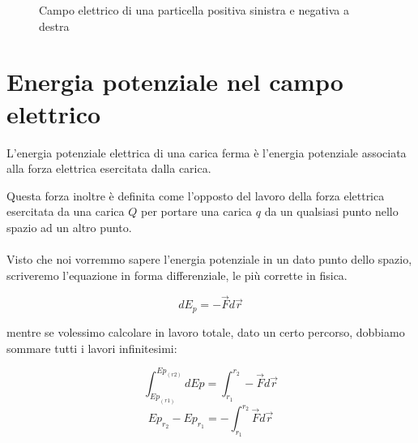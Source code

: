 \begin{figure}[H]
\begin{minipage}[c]{0.4\textwidth}
     \end{minipage}
     \caption{Campo elettrico di una particella positiva sinistra e negativa a destra}
 \end{figure}\textbf{}

\section{Energia potenziale nel campo elettrico}
L'energia potenziale elettrica di una carica ferma è l'energia potenziale associata alla forza elettrica esercitata dalla carica.

Questa forza inoltre è definita come l'opposto del lavoro della forza elettrica esercitata da una carica $Q$ per portare una carica $q$ da un qualsiasi punto nello spazio ad un altro punto.
\paragraph{}
Visto che noi vorremmo sapere l'energia potenziale in un dato punto dello spazio, scriveremo l'equazione in forma differenziale, le più corrette in fisica.

\begin{equation}
    dE_p = -\vec{F}d\vec{r}
\end{equation}

mentre se volessimo calcolare in lavoro totale, dato un certo percorso, dobbiamo sommare tutti i lavori infinitesimi:

\begin{equation*}
    \int_{Ep_{(r1)}}^{Ep_{(r2)}} dEp = \int_{r_1}^{r_2} -\vec{F}d\vec{r}
\end{equation*}
\begin{equation*}
    Ep_{r_2} - Ep_{r_1}= -\int_{r_1}^{r_2} \vec{F}d\vec{r}
\end{equation*}

